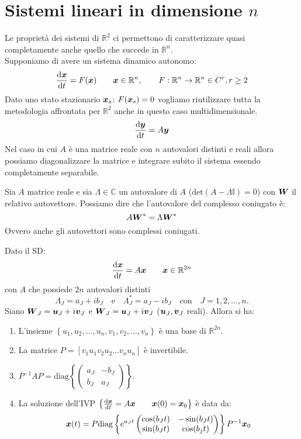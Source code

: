 \section{Sistemi lineari in dimensione $n$}%
\label{sub:Sistemi lineari in dimensione n}
Le proprietà dei sistemi di $\mathbb{R}^2$  ci permettono di caratterizzare quasi completamente anche quello che succede in $\mathbb{R}^n$.\\
Supponiamo di avere un sistema dinamico autonomo:
\[
    \frac{\text{d} \boldsymbol{x}}{\text{d} t} = F(\boldsymbol{x}) \qquad \boldsymbol{x}\in \mathbb{R}^n, \qquad F: \mathbb{R}^n \to \mathbb{R}^n \in C^r, r\ge 2
\] 
Dato uno stato stazionario $\boldsymbol{x}_s$: $F(\boldsymbol{x}_s) = 0$ vogliamo riutilizzare tutta la metodologia affrontata per $\mathbb{R}^2$  anche in questo caso multidimensionale.
\[
    \frac{\text{d} \boldsymbol{y}}{\text{d} t} = A \boldsymbol{y}
\] 
Nel caso in cui $A$ è una matrice reale con $n$ autovalori distinti e reali allora possiamo diagonalizzare la matrice e integrare subito il sistema essendo completamente separabile.\\
\begin{thm}[Autovettore C.C.]
    Sia $A$ matrice reale e sia $\Lambda \in \mathbb{C}$ un autovalore di $A$ ($\text{det}(A-\Lambda\mathbb{I})=0$) con $\boldsymbol{W}$ il relativo autovettore. Possiamo dire che l'autovalore del complesso coniugato è:
    \[
        A\boldsymbol{W}^* = \Lambda\boldsymbol{W}^*
    \] 
    Ovvero anche gli autovettori sono complessi coniugati.
\end{thm}
\noindent
\begin{thm}
    Dato il SD: 
    \[
        \frac{\text{d} \boldsymbol{x}}{\text{d} t} = A \boldsymbol{x} \qquad \boldsymbol{x}\in \mathbb{R}^{2n}
    \] 
    con $A$ che possiede $2n$ autovalori distinti 
    \[
	\Lambda_J = a_J + i b_J \quad \text{e} \quad \Lambda^*_{J} = a_J - i b_{J} \quad \text{con} \quad J = 1, 2, \ldots, n.
    \] 
    Siano $\boldsymbol{W}_J = \boldsymbol{u}_J + i \boldsymbol{v}_J$ e $\boldsymbol{W}_J = \boldsymbol{u}_J + i \boldsymbol{v}_J$ ($\boldsymbol{u}_J, \boldsymbol{v}_J$ reali). Allora si ha:
    \begin{enumerate}
        \item L'insieme $\left\{u_1,u_2,\ldots, u_n, v_1, v_2, \ldots, v_n\right\}$ è una base di $\mathbb{R}^{2n}$.
	\item La matrice $P = \left[v_1 u_1 v_2 u_2 \ldots v_n u_n\right]$ è invertibile.
	\item $P^{-1}AP = \text{diag}\left\{\begin{pmatrix} a_J & -b_J \\ b_J & a_J \end{pmatrix} \right\}$.
	\item La soluzione dell'IVP $\left\{\frac{\text{d} \boldsymbol{x}}{\text{d} t} = A \boldsymbol{x} \qquad \boldsymbol{x}(0) = \boldsymbol{x}_0\right\}$  è data da:
	    \[
		\boldsymbol{x} (t)=P\text{diag}\left\{e^{a_{J}t}\begin{pmatrix} \cos (b_Jt) & - \sin (b_Jt) \\ \sin (b_Jt) & \cos (b_{j}t) \end{pmatrix} \right\} P^{-1}\boldsymbol{x}_0
	    \] 
    \end{enumerate}
\end{thm}
